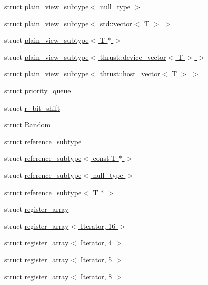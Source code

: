 \begin{DoxyCompactItemize}
struct \hyperlink{structcugar_1_1plain__view__subtype_3_01null__type_01_4}{plain\+\_\+view\+\_\+subtype$<$ null\+\_\+type $>$}
\item 
struct \hyperlink{structcugar_1_1plain__view__subtype_3_01std_1_1vector_3_01_t_01_4_01_4}{plain\+\_\+view\+\_\+subtype$<$ std\+::vector$<$ T $>$ $>$}
\item 
struct \hyperlink{structcugar_1_1plain__view__subtype_3_01_t_01_5_01_4}{plain\+\_\+view\+\_\+subtype$<$ T $\ast$ $>$}
\item 
struct \hyperlink{structcugar_1_1plain__view__subtype_3_01thrust_1_1device__vector_3_01_t_01_4_01_4}{plain\+\_\+view\+\_\+subtype$<$ thrust\+::device\+\_\+vector$<$ T $>$ $>$}
\item 
struct \hyperlink{structcugar_1_1plain__view__subtype_3_01thrust_1_1host__vector_3_01_t_01_4_01_4}{plain\+\_\+view\+\_\+subtype$<$ thrust\+::host\+\_\+vector$<$ T $>$ $>$}
\item 
struct \hyperlink{structcugar_1_1priority__queue}{priority\+\_\+queue}
\item 
struct \hyperlink{structcugar_1_1r__bit__shift}{r\+\_\+bit\+\_\+shift}
\item 
struct \hyperlink{structcugar_1_1_random}{Random}
\item 
struct \hyperlink{structcugar_1_1reference__subtype}{reference\+\_\+subtype}
\item 
struct \hyperlink{structcugar_1_1reference__subtype_3_01const_01_t_01_5_01_4}{reference\+\_\+subtype$<$ const T $\ast$ $>$}
\item 
struct \hyperlink{structcugar_1_1reference__subtype_3_01null__type_01_4}{reference\+\_\+subtype$<$ null\+\_\+type $>$}
\item 
struct \hyperlink{structcugar_1_1reference__subtype_3_01_t_01_5_01_4}{reference\+\_\+subtype$<$ T $\ast$ $>$}
\item 
struct \hyperlink{structcugar_1_1register__array}{register\+\_\+array}
\item 
struct \hyperlink{structcugar_1_1register__array_3_01_iterator_00_0116_01_4}{register\+\_\+array$<$ Iterator, 16 $>$}
\item 
struct \hyperlink{structcugar_1_1register__array_3_01_iterator_00_014_01_4}{register\+\_\+array$<$ Iterator, 4 $>$}
\item 
struct \hyperlink{structcugar_1_1register__array_3_01_iterator_00_015_01_4}{register\+\_\+array$<$ Iterator, 5 $>$}
\item 
struct \hyperlink{structcugar_1_1register__array_3_01_iterator_00_018_01_4}{register\+\_\+array$<$ Iterator, 8 $>$}

\end{DoxyCompactItemize}
